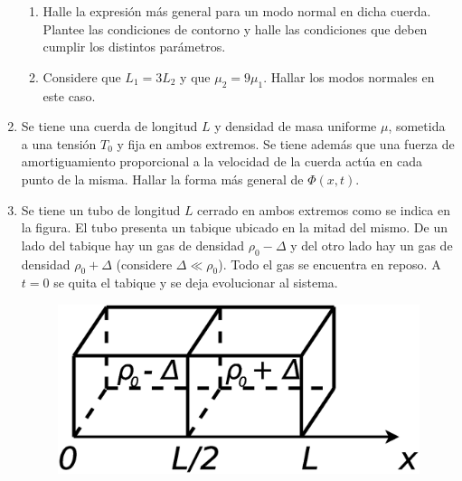 \documentclass[11pt,spanish,a4paper]{article}
\begin{document}
\begin{enumerate}
\begin{enumerate}
\item Halle la expresión más general para un modo normal en dicha cuerda.
Plantee las condiciones de contorno y halle las condiciones que deben
cumplir los distintos parámetros.
\item Considere que $L_{1}=3L_{2}$ y que $\mu_{2}=9\mu_{1}$. Hallar los
modos normales en este caso.
\end{enumerate}
\item Se tiene una cuerda de longitud $L$ y densidad de masa uniforme $\mu$,
sometida a una tensión $T_{0}$ y fija en ambos extremos. Se tiene
además que una fuerza de amortiguamiento proporcional a la velocidad
de la cuerda actúa en cada punto de la misma. Hallar la forma más
general de $\Phi(x,t)$.
\item Se tiene un tubo de longitud $L$ cerrado en ambos extremos como se
indica en la figura. El tubo presenta un tabique ubicado en la mitad
del mismo. De un lado del tabique hay un gas de densidad $\rho_{0}-\Delta$
y del otro lado hay un gas de densidad $\rho_{0}+\Delta$ (considere
$\Delta\ll\rho_{0}$). Todo el gas se encuentra en reposo. A $t=0$
se quita el tabique y se deja evolucionar al sistema.
\begin{figure}[H]
\centering{}\includegraphics[clip,scale=0.25]{ej1-30}
\end{figure}



\end{enumerate}
\end{document}
